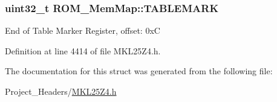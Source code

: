 \subsubsection[{\texorpdfstring{T\+A\+B\+L\+E\+M\+A\+RK}{TABLEMARK}}]{\setlength{\rightskip}{0pt plus 5cm}uint32\+\_\+t R\+O\+M\+\_\+\+Mem\+Map\+::\+T\+A\+B\+L\+E\+M\+A\+RK}\hypertarget{struct_r_o_m___mem_map_a663e5f468cf810e6f1d672690b63b141}{}\label{struct_r_o_m___mem_map_a663e5f468cf810e6f1d672690b63b141}
End of Table Marker Register, offset\+: 0xC 

Definition at line 4414 of file M\+K\+L25\+Z4.\+h.



The documentation for this struct was generated from the following file\+:\begin{DoxyCompactItemize}
\item 
Project\+\_\+\+Headers/\hyperlink{_m_k_l25_z4_8h}{M\+K\+L25\+Z4.\+h}\end{DoxyCompactItemize}
